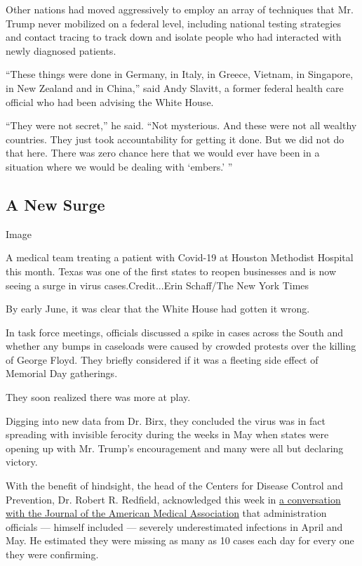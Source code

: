 Other nations had moved aggressively to employ an array of techniques
that Mr. Trump never mobilized on a federal level, including national
testing strategies and contact tracing to track down and isolate people
who had interacted with newly diagnosed patients.

``These things were done in Germany, in Italy, in Greece, Vietnam, in
Singapore, in New Zealand and in China,'' said Andy Slavitt, a former
federal health care official who had been advising the White House.

``They were not secret,'' he said. ``Not mysterious. And these were not
all wealthy countries. They just took accountability for getting it
done. But we did not do that here. There was zero chance here that we
would ever have been in a situation where we would be dealing with
`embers.' ''

\hypertarget{a-new-surge}{%
\subsection{A New Surge}\label{a-new-surge}}

Image

A medical team treating a patient with Covid-19 at Houston Methodist
Hospital this month. Texas was one of the first states to reopen
businesses and is now seeing a surge in virus cases.Credit...Erin
Schaff/The New York Times

By early June, it was clear that the White House had gotten it wrong.

In task force meetings, officials discussed a spike in cases across the
South and whether any bumps in caseloads were caused by crowded protests
over the killing of George Floyd. They briefly considered if it was a
fleeting side effect of Memorial Day gatherings.

They soon realized there was more at play.

Digging into new data from Dr. Birx, they concluded the virus was in
fact spreading with invisible ferocity during the weeks in May when
states were opening up with Mr. Trump's encouragement and many were all
but declaring victory.

With the benefit of hindsight, the head of the Centers for Disease
Control and Prevention, Dr. Robert R. Redfield, acknowledged this week
in
\href{https://jamanetwork.com/journals/jama/pages/conversations-with-dr-bauchner}{a
conversation with the Journal of the American Medical Association} that
administration officials --- himself included --- severely
underestimated infections in April and May. He estimated they were
missing as many as 10 cases each day for every one they were confirming.

